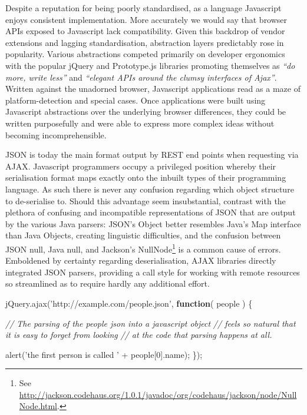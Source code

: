 \documentclass[]{article}
\newenvironment{Shaded}{}{}
\newcommand{\KeywordTok}[1]{\textcolor[rgb]{0.00,0.44,0.13}{\textbf{{#1}}}}
\newcommand{\DecValTok}[1]{\textcolor[rgb]{0.25,0.63,0.44}{{#1}}}
\newcommand{\StringTok}[1]{\textcolor[rgb]{0.25,0.44,0.63}{{#1}}}
\newcommand{\CommentTok}[1]{\textcolor[rgb]{0.38,0.63,0.69}{\textit{{#1}}}}
\newcommand{\OtherTok}[1]{\textcolor[rgb]{0.00,0.44,0.13}{{#1}}}
\newcommand{\FunctionTok}[1]{\textcolor[rgb]{0.02,0.16,0.49}{{#1}}}
\newcommand{\NormalTok}[1]{{#1}}
\begin{document}
Despite a reputation for being poorly standardised, as a language
Javascript enjoys consistent implementation. More accurately we would
say that browser APIs exposed to Javascript lack compatibility. Given
this backdrop of vendor extensions and lagging standardisation,
abstraction layers predictably rose in popularity. Various abstractions
competed primarily on developer ergonomics with the popular jQuery and
Prototype.js libraries promoting themselves as \emph{``do more, write
less''} and \emph{``elegant APIs around the clumsy interfaces of
Ajax''}. Written against the unadorned browser, Javascript applications
read as a maze of platform-detection and special cases. Once
applications were built using Javascript abstractions over the
underlying browser differences, they could be written purposefully and
were able to express more complex ideas without becoming
incomprehensible.

JSON is today the main format output by REST end points when requesting
via AJAX. Javascript programmers occupy a privileged position whereby
their serialisation format maps exactly onto the inbuilt types of their
programming language. As such there is never any confusion regarding
which object structure to de-serialise to. Should this advantage seem
insubstantial, contrast with the plethora of confusing and incompatible
representations of JSON that are output by the various Java parsers:
JSON's Object better resembles Java's Map interface than Java Objects,
creating linguistic difficulties, and the confusion between JSON null,
Java null, and Jackson's NullNode\footnote{See
  \url{http://jackson.codehaus.org/1.0.1/javadoc/org/codehaus/jackson/node/NullNode.html}.}
is a common cause of errors. Emboldened by certainty regarding
deserialisation, AJAX libraries directly integrated JSON parsers,
providing a call style for working with remote resources so streamlined
as to require hardly any additional effort.

\begin{Shaded}
\begin{Highlighting}[]
\OtherTok{jQuery}\NormalTok{.}\FunctionTok{ajax}\NormalTok{(}\StringTok{'http://example.com/people.json'}\NormalTok{, }\KeywordTok{function}\NormalTok{( people ) \{}

   \CommentTok{// The parsing of the people json into a javascript object}
   \CommentTok{// feels so natural that it is easy to forget from looking }
   \CommentTok{// at the code that parsing happens at all. }
   
   \FunctionTok{alert}\NormalTok{(}\StringTok{'the first person is called '} \NormalTok{+ people[}\DecValTok{0}\NormalTok{].}\FunctionTok{name}\NormalTok{);}
\NormalTok{\});}
\end{Highlighting}
\end{Shaded}
\end{document}
